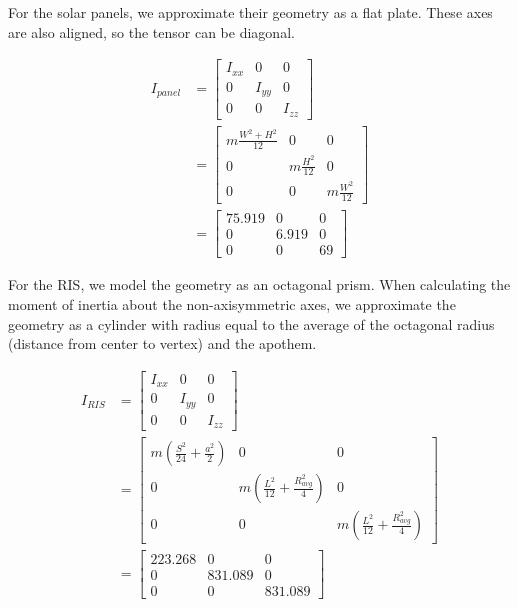 For the solar panels, we approximate their geometry as a flat plate. These axes are also aligned, so the tensor can be diagonal.

\begin{align*}
I_{panel} &=
\begin{bmatrix}
I_{xx} & 0 & 0 \\
0 & I_{yy} & 0 \\
0 & 0 & I_{zz}
\end{bmatrix} \\
&=
\begin{bmatrix}
m \frac{W^{2} + H^{2}}{12} & 0 & 0 \\
0 & m \frac{H^{2}}{12} & 0 \\
0 & 0 & m \frac{W^{2}}{12} 
\end{bmatrix} \\
&=
\begin{bmatrix}
75.919 & 0 & 0 \\
0 & 6.919 & 0 \\
0 & 0 & 69 
\end{bmatrix}
\end{align*}

For the RIS, we model the geometry as an octagonal prism. When calculating the moment of inertia about the non-axisymmetric axes, we approximate the geometry as a cylinder with radius equal to the average of the octagonal radius (distance from center to vertex) and the apothem.

\begin{align*}
I_{RIS} &=
\begin{bmatrix}
I_{xx} & 0 & 0 \\
0 & I_{yy} & 0 \\
0 & 0 & I_{zz}
\end{bmatrix} \\
&=
\begin{bmatrix}
m \left(\frac{S^{2}}{24} + \frac{a^{2}}{2}\right) & 0 & 0 \\
0 & m \left(\frac{L^{2}}{12} + \frac{R_{avg}^{2}}{4}\right) & 0 \\
0 & 0 & m \left(\frac{L^{2}}{12} + \frac{R_{avg}^{2}}{4}\right) 
\end{bmatrix} \\
&=
\begin{bmatrix}
223.268 & 0 & 0 \\
0 & 831.089 & 0 \\
0 & 0 & 831.089 
\end{bmatrix}
\end{align*}

